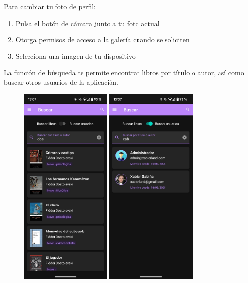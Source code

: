 \documentclass[a4paper,12pt]{report}
\begin{document}
    Para cambiar tu foto de perfil:
    \begin{enumerate}
      \item Pulsa el botón de cámara junto a tu foto actual
      \item Otorga permisos de acceso a la galería cuando se soliciten
      \item Selecciona una imagen de tu dispositivo
    \end{enumerate}
    
    
    La función de búsqueda te permite encontrar libros por título o autor, así como buscar otros usuarios de la aplicación.
    
    \begin{figure}[H]
      \centering
      \includegraphics[width=0.4\textwidth]{.img/buscador-libros.png}
      \hspace{1cm}
      \includegraphics[width=0.4\textwidth]{.img/buscador-usuarios.png}

\end{figure}
\end{document}

